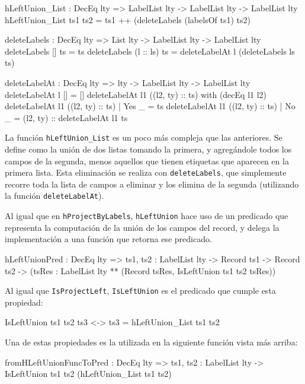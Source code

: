 \begin{code}
hLeftUnion_List : DecEq lty => LabelList lty ->
  LabelList lty -> LabelList lty
hLeftUnion_List ts1 ts2 =
  ts1 ++ (deleteLabels (labelsOf ts1) ts2)

deleteLabels : DecEq lty => List lty -> LabelList lty ->
  LabelList lty
deleteLabels [] ts = ts
deleteLabels (l :: ls) ts =
  deleteLabelAt l (deleteLabels ls ts)

deleteLabelAt : DecEq lty => lty -> LabelList lty ->
  LabelList lty
deleteLabelAt l [] = []
deleteLabelAt l1 ((l2, ty) :: ts) with (decEq l1 l2)
  deleteLabelAt l1 ((l2, ty) :: ts) | Yes _ = ts
  deleteLabelAt l1 ((l2, ty) :: ts) | No _ =
    (l2, ty) :: deleteLabelAt l1 ts
\end{code}

La función \texttt{hLeftUnion\_List} es un poco más compleja que las anteriores. Se define como la unión de dos listas tomando la primera, y agregándole todos los campos de la segunda, menos aquellos que tienen etiquetas que aparecen en la primera lista. Esta eliminación se realiza con \texttt{deleteLabels}, que simplemente recorre toda la lista de campos a eliminar y los elimina de la segunda (utilizando la función \texttt{deleteLabelAt}).

Al igual que en \texttt{hProjectByLabels}, \texttt{hLeftUnion} hace uso de un predicado que representa la computación de la unión de los campos del record, y delega la implementación a una función que retorna ese predicado.

\begin{code}
hLeftUnionPred : DecEq lty => {ts1, ts2 : LabelList lty} ->
  Record ts1 -> Record ts2 ->
  (tsRes : LabelList lty ** (Record tsRes,
    IsLeftUnion ts1 ts2 tsRes))
\end{code}

Al igual que \texttt{IsProjectLeft}, \texttt{IsLeftUnion} es el predicado que cumple esta propiedad:

\begin{code}
IsLeftUnion ts1 ts2 ts3 <-> ts3 = hLeftUnion_List ts1 ts2
\end{code}

Una de estas propiedades es la utilizada en la siguiente función vista más arriba:

\begin{code}
fromHLeftUnionFuncToPred : DecEq lty =>
  {ts1, ts2 : LabelList lty} ->
  IsLeftUnion ts1 ts2 (hLeftUnion_List ts1 ts2)
\end{code}

